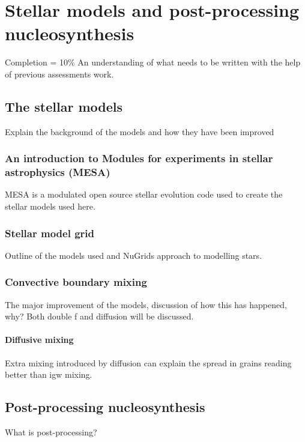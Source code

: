\chapter{Stellar models and post-processing nucleosynthesis}

Completion = 10\%
An understanding of what needs to be written with the help of previous assessments work.

\section{The stellar models}

Explain the background of the models and how they have been improved

\subsection{An introduction to Modules for experiments in stellar astrophysics (MESA)}

MESA is a modulated open source stellar evolution code used to create the stellar models used here.

\subsection{Stellar model grid}

Outline of the models used and NuGrids approach to modelling stars.

\subsection{Convective boundary mixing}

The major improvement of the models, discussion of how this has happened, why? Both double f and diffusion will be discussed.

\subsubsection{Diffusive mixing}

Extra mixing introduced by diffusion can explain the spread in grains reading better than \acrfull{igw} mixing.

\section{Post-processing nucleosynthesis}

What is post-processing?

